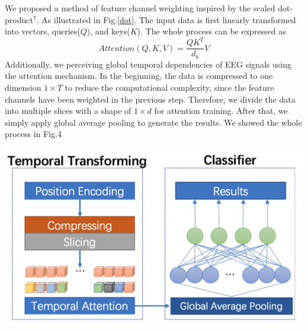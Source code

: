 \documentclass[a0,portrait]{a0poster}
\begin{document}
\begin{minipage}[c]{\linewidth}
\begin{framed}
\begin{multicols}{2}
We proposed a method of feature channel weighting inspired by the scaled dot-product$^7$. As illustrated in Fig.\ref{dot}. The input data is first linearly transformed into vectors, queries($Q$), and keys($K$). The whole process can be expressed as $$Attention(Q, K, V) = \frac{QK^{T}}{d_k}V$$Additionally, we perceiving global temporal dependencies of EEG signals using the attention mechanism. In the beginning, the data is compressed to one dimension $1{\times}T$ to reduce the computational complexity, since the feature channels have been weighted in the previous step. Therefore, we divide the data into multiple slices with a shape of $1{\times}d$ for attention training. After that, we simply apply global average pooling to generate the results. We showed the whole process in Fig.4\\
\begin {center}
\includegraphics{figures/process}
\label{process}
\end{center}
\color{Black}

\end{multicols}
\end{framed}
\end{minipage}
\end{document}
